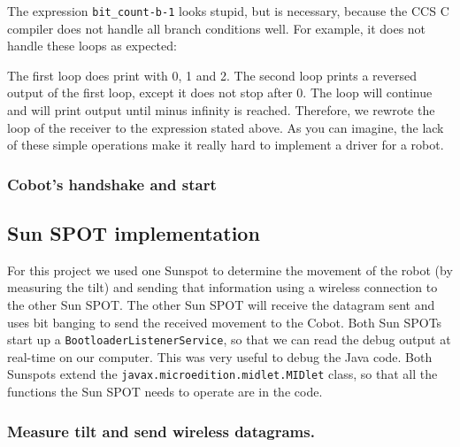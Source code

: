 \documentclass[a4paper,10pt]{article} %
\begin{document}


\noindent The expression \texttt{bit\_count-b-1} looks stupid, but is necessary,
because the CCS C compiler does not handle all branch conditions well. For
example, it does not handle these loops as expected:



\noindent The first loop does print  with 0, 1 and 2. The second loop
prints a reversed output of the first loop, except it does not stop after 0. The
loop will continue and will print output until minus infinity is reached.
Therefore, we rewrote the loop of the receiver to the expression stated above.
As you can imagine, the lack of these simple operations make it really hard to
implement a driver for a robot.


\subsubsection{Cobot's handshake and start} %
\label{ssub:Cobot's handshake and start}





\subsection{Sun SPOT implementation} %
\label{sub:Sun SPOT implementation}

For this project we used one Sunspot to determine the movement of the robot (by
measuring the tilt) and sending that information using a wireless connection to
the other Sun SPOT. The other Sun SPOT will receive the datagram sent and uses
bit banging to send the received movement to the Cobot. Both Sun SPOTs start up
a \texttt{BootloaderListenerService}, so that we can read the debug output at
real-time on our computer. This was very useful to debug the Java code. Both
Sunspots extend the \texttt{javax.microedition.midlet.MIDlet} class, so that all
the functions the Sun SPOT needs to operate are in the code.

\subsubsection{Measure tilt and send wireless datagrams.} %
\end{document}
